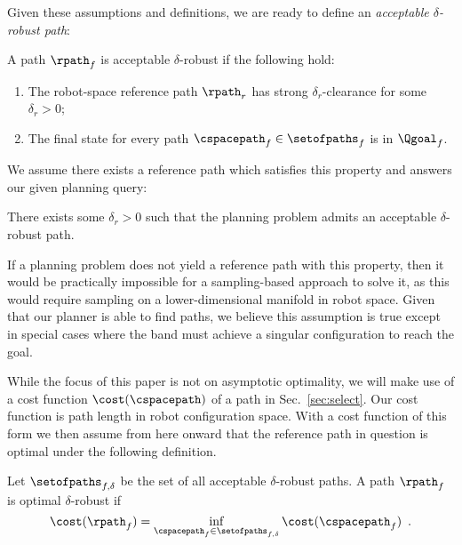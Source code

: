 
Given these assumptions and definitions, we are ready to define an \textit{acceptable $\delta$-robust path}:

\begin{definition}
\label{def:robust}
A path $\rpath_f$ is acceptable $\delta$-robust if the following hold:
\begin{enumerate}
    \item The robot-space reference path $\rpath_r$ has strong $\delta_r$-clearance for some $\delta_r > 0$;
    \item The final state for every path $\cspacepath_f \in \setofpaths_f$ is in $\Qgoal_f$. 
\end{enumerate}
\end{definition}

\noindent We assume there exists a reference path which satisfies this property and answers our given planning query:

\begin{assumption}
    There exists some $\delta_r > 0$ such that the planning problem admits an acceptable $\delta$-robust path.
    \label{ass:solvable_problem}
\end{assumption}

If a planning problem does not yield a reference path with this property, then it would be practically impossible for a sampling-based approach to solve it, as this would require sampling on a lower-dimensional manifold in robot space. Given that our planner is able to find paths, we believe this assumption is true except in special cases where the band must achieve a singular configuration to reach the goal.


While the focus of this paper is not on asymptotic optimality, we will make use of a cost function $\cost(\cspacepath)$ of a path in Sec.~\ref{sec:select}. Our cost function is path length in robot configuration space. With a cost function of this form we then assume from here onward that the reference path in question is optimal under the following definition.

\begin{definition}
    Let $\setofpaths_{f,\delta}$ be the set of all acceptable $\delta$-robust paths. A path $\rpath_f$ is optimal $\delta$-robust if
    \begin{equation}
        \cost(\rpath_f) = \inf_{\cspacepath_f \in \setofpaths_{f,\delta}} \cost(\cspacepath_f) \enspace .
    \end{equation}
\end{definition}

